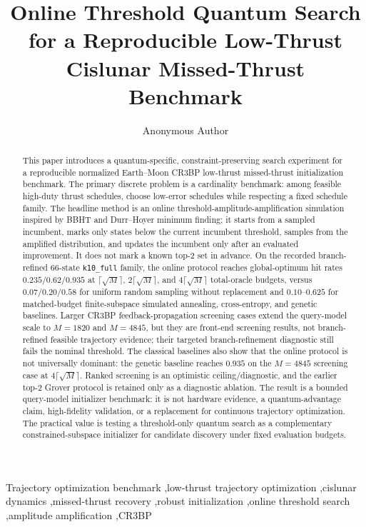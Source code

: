 \documentclass[preprint,12pt]{elsarticle}
\begin{document}
\begin{frontmatter}

\title{Online Threshold Quantum Search for a Reproducible Low-Thrust Cislunar Missed-Thrust Benchmark}

\author[aff1]{Anonymous Author}
\address[aff1]{Manuscript prepared for review; affiliation omitted in this draft}

\begin{abstract}
This paper introduces a quantum-specific, constraint-preserving search experiment for a reproducible normalized Earth--Moon CR3BP low-thrust missed-thrust initialization benchmark. The primary discrete problem is a cardinality benchmark: among feasible high-duty thrust schedules, choose low-error schedules while respecting a fixed schedule family. The headline method is an online threshold-amplitude-amplification simulation inspired by BBHT and Durr--Hoyer minimum finding; it starts from a sampled incumbent, marks only states below the current incumbent threshold, samples from the amplified distribution, and updates the incumbent only after an evaluated improvement. It does not mark a known top-2 set in advance. On the recorded branch-refined 66-state \texttt{k10\_full} family, the online protocol reaches global-optimum hit rates $0.235/0.62/0.935$ at $\lceil\sqrt{M}\rceil$, $2\lceil\sqrt{M}\rceil$, and $4\lceil\sqrt{M}\rceil$ total-oracle budgets, versus $0.07/0.20/0.58$ for uniform random sampling without replacement and $0.10$--$0.625$ for matched-budget finite-subspace simulated annealing, cross-entropy, and genetic baselines. Larger CR3BP feedback-propagation screening cases extend the query-model scale to $M=1820$ and $M=4845$, but they are front-end screening results, not branch-refined feasible trajectory evidence; their targeted branch-refinement diagnostic still fails the nominal threshold. The classical baselines also show that the online protocol is not universally dominant: the genetic baseline reaches $0.935$ on the $M=4845$ screening case at $4\lceil\sqrt{M}\rceil$. Ranked screening is an optimistic ceiling/diagnostic, and the earlier top-2 Grover protocol is retained only as a diagnostic ablation. The result is a bounded query-model initializer benchmark: it is not hardware evidence, a quantum-advantage claim, high-fidelity validation, or a replacement for continuous trajectory optimization. The practical value is testing a threshold-only quantum search as a complementary constrained-subspace initializer for candidate discovery under fixed evaluation budgets.
\end{abstract}

\begin{keyword}
Trajectory optimization benchmark \sep low-thrust trajectory optimization \sep cislunar dynamics \sep missed-thrust recovery \sep robust initialization \sep online threshold search \sep amplitude amplification \sep CR3BP
\end{keyword}

\end{frontmatter}
\end{document}
